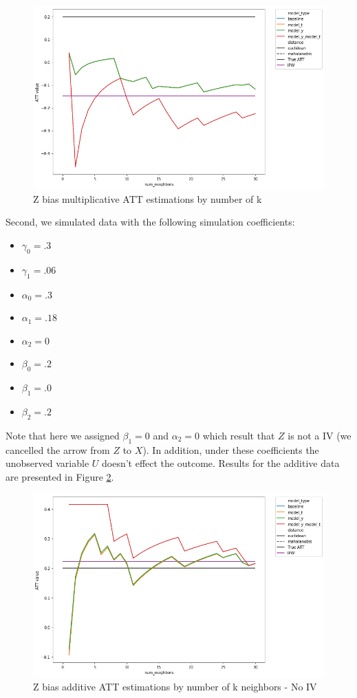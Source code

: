 \documentclass{article}
\begin{document}
\begin{figure}[H]
    \centering
    \includegraphics[width=\textwidth]{Paper/images/z_bias_multiplicative_ATT_estimations_by_k_neighbors.png}
    \caption{Z bias multiplicative ATT estimations by number of k}
    \label{fig:z_bias_multi}
\end{figure}


Second, we simulated data with the following simulation coefficients:
\begin{itemize}
    \item $\gamma_0 = .3$
    \item $\gamma_1 = .06$
    \item $\alpha_0 = .3$
    \item $\alpha_1 = .18$
    \item $\alpha_2 = 0$ 
    \item $\beta_0 = .2$
    \item $\beta_1 = .0$ 
    \item $\beta_2 = .2$
\end{itemize}
Note that here we assigned $\beta_1=0$ and $\alpha_2 = 0$ which result that $Z$ is not a IV (we cancelled the arrow from $Z$ to $X$). In addition, under these coefficients the unobserved variable $U$ doesn't effect the outcome.  
Results for the additive data are presented in Figure \ref{fig:z_bias_add_no_alpha2}. 
\begin{figure}[H]
    \centering
    \includegraphics[width=\textwidth]{Paper/images/z_bias_additive_ATT_estimations_by_k_neighbors_no_alpha2.png}
    \caption{Z bias additive ATT estimations by number of k neighbors - No IV}
    \label{fig:z_bias_add_no_alpha2}
\end{figure}
\end{document}
